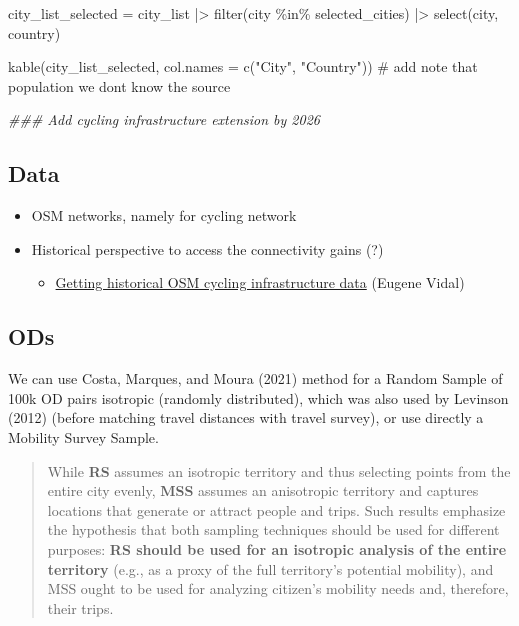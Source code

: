 \documentclass[
  sn-nature,
]{sn-jnl}
\newenvironment{Shaded}{\begin{snugshade}}{\end{snugshade}}
\newcommand{\AttributeTok}[1]{\textcolor[rgb]{0.40,0.45,0.13}{#1}}
\newcommand{\CommentTok}[1]{\textcolor[rgb]{0.37,0.37,0.37}{#1}}
\newcommand{\DocumentationTok}[1]{\textcolor[rgb]{0.37,0.37,0.37}{\textit{#1}}}
\newcommand{\FunctionTok}[1]{\textcolor[rgb]{0.28,0.35,0.67}{#1}}
\newcommand{\NormalTok}[1]{\textcolor[rgb]{0.00,0.23,0.31}{#1}}
\newcommand{\OtherTok}[1]{\textcolor[rgb]{0.00,0.23,0.31}{#1}}
\newcommand{\SpecialCharTok}[1]{\textcolor[rgb]{0.37,0.37,0.37}{#1}}
\newcommand{\StringTok}[1]{\textcolor[rgb]{0.13,0.47,0.30}{#1}}
\providecommand{\tightlist}{%
  \setlength{\itemsep}{0pt}\setlength{\parskip}{0pt}}
\begin{document}
\begin{Shaded}
\begin{Highlighting}[]
\NormalTok{city\_list\_selected }\OtherTok{=}\NormalTok{ city\_list }\SpecialCharTok{|\textgreater{}}
  \FunctionTok{filter}\NormalTok{(city }\SpecialCharTok{\%in\%}\NormalTok{ selected\_cities) }\SpecialCharTok{|\textgreater{}}
  \FunctionTok{select}\NormalTok{(city, country)}

\FunctionTok{kable}\NormalTok{(city\_list\_selected, }
      \AttributeTok{col.names =} \FunctionTok{c}\NormalTok{(}\StringTok{"City"}\NormalTok{, }\StringTok{"Country"}\NormalTok{))}
\CommentTok{\# add note that population we don\textquotesingle{}t know the source}


\DocumentationTok{\#\#\# Add cycling infrastructure extension by 2026}
\end{Highlighting}
\end{Shaded}

\subsection{Data}\label{data}

\begin{itemize}
\item
  OSM networks, namely for cycling network
\item
  Historical perspective to access the connectivity gains (?)

  \begin{itemize}
  \tightlist
  \item
    \href{https://eugenividal.github.io/slides/getting-historical-visible-cycling-infra-from-osm-main/README.html}{Getting
    historical OSM cycling infrastructure data} (Eugene Vidal)
  \end{itemize}
\end{itemize}

\subsection{ODs}\label{ods}

We can use Costa, Marques, and Moura (2021) method for a Random Sample
of 100k OD pairs isotropic (randomly distributed), which was also used
by Levinson (2012) (before matching travel distances with travel
survey), or use directly a Mobility Survey Sample.

\begin{quote}
While \textbf{RS} assumes an isotropic territory and thus selecting
points from the entire city evenly, \textbf{MSS} assumes an anisotropic
territory and captures locations that generate or attract people and
trips. Such results emphasize the hypothesis that both sampling
techniques should be used for different purposes: \textbf{RS should be
used for an isotropic analysis of the entire territory} (e.g., as a
proxy of the full territory's potential mobility), and MSS ought to be
used for analyzing citizen's mobility needs and, therefore, their trips.
\end{quote}
\end{document}
